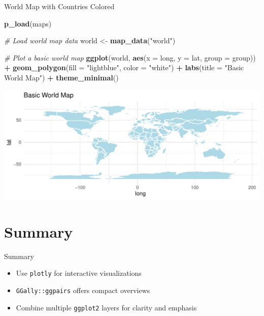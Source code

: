 \documentclass[
  ignorenonframetext,
]{beamer}
\newenvironment{Shaded}{\begin{snugshade}}{\end{snugshade}}
\newcommand{\AttributeTok}[1]{\textcolor[rgb]{0.13,0.29,0.53}{#1}}
\newcommand{\CommentTok}[1]{\textcolor[rgb]{0.56,0.35,0.01}{\textit{#1}}}
\newcommand{\FunctionTok}[1]{\textcolor[rgb]{0.13,0.29,0.53}{\textbf{#1}}}
\newcommand{\NormalTok}[1]{#1}
\newcommand{\OtherTok}[1]{\textcolor[rgb]{0.56,0.35,0.01}{#1}}
\newcommand{\SpecialCharTok}[1]{\textcolor[rgb]{0.81,0.36,0.00}{\textbf{#1}}}
\newcommand{\StringTok}[1]{\textcolor[rgb]{0.31,0.60,0.02}{#1}}
\providecommand{\tightlist}{%
  \setlength{\itemsep}{0pt}\setlength{\parskip}{0pt}}
\begin{document}
\begin{frame}[fragile]{World Map with Countries Colored}
\label{world-map-with-countries-colored}
\begin{Shaded}
\begin{Highlighting}[]
\FunctionTok{p\_load}\NormalTok{(maps)}

\CommentTok{\# Load world map data}
\NormalTok{world }\OtherTok{\textless{}{-}} \FunctionTok{map\_data}\NormalTok{(}\StringTok{"world"}\NormalTok{)}

\CommentTok{\# Plot a basic world map}
\FunctionTok{ggplot}\NormalTok{(world, }\FunctionTok{aes}\NormalTok{(}\AttributeTok{x =}\NormalTok{ long, }\AttributeTok{y =}\NormalTok{ lat, }\AttributeTok{group =}\NormalTok{ group)) }\SpecialCharTok{+}
  \FunctionTok{geom\_polygon}\NormalTok{(}\AttributeTok{fill =} \StringTok{"lightblue"}\NormalTok{, }\AttributeTok{color =} \StringTok{"white"}\NormalTok{) }\SpecialCharTok{+}
  \FunctionTok{labs}\NormalTok{(}\AttributeTok{title =} \StringTok{"Basic World Map"}\NormalTok{) }\SpecialCharTok{+}
  \FunctionTok{theme\_minimal}\NormalTok{()}
\end{Highlighting}
\end{Shaded}

\includegraphics{StatisticsWithR-3-Exploratory_Analysis_II_And_Graphics_files/figure-beamer/unnamed-chunk-33-1.pdf}
\end{frame}

\section{Summary}\label{summary-1}

\begin{frame}[fragile]{Summary}
\begin{itemize}
\tightlist
\item
  Use \texttt{plotly} for interactive visualizations
\item
  \texttt{GGally::ggpairs} offers compact overviews
\item
  Combine multiple \texttt{ggplot2} layers for clarity and emphasis
\end{itemize}
\end{frame}
\end{document}
